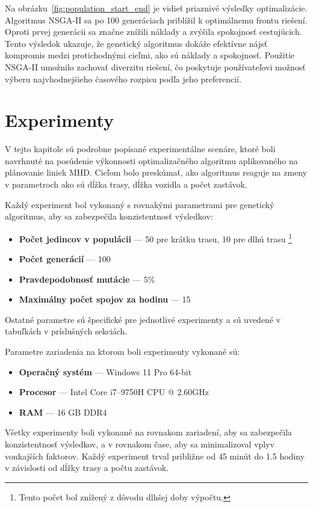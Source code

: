 Na obrázku~\ref{fig:population_start_end} je vidieť priaznivé výsledky optimalizácie.
Algoritmus NSGA-II sa po 100 generáciach priblížil k optimálnemu frontu riešení.
Oproti prvej generácii sa značne znížili náklady a zvýšila spokojnosť cestujúcich.
Tento výsledok ukazuje, že genetický algoritmus dokáže efektívne nájsť kompromis medzi protichodnými cieľmi, ako sú náklady a spokojnosť.
Použitie NSGA-II umožnilo zachovať diverzitu riešení, čo poskytuje používateľovi možnosť výberu najvhodnejšieho časového rozpisu podľa jeho preferencií.

\chapter{Experimenty}\label{experimenty}

V tejto kapitole sú podrobne popísané experimentálne scenáre, ktoré boli navrhnuté na posúdenie výkonnosti optimalizačného algoritmu aplikovaného na plánovanie liniek MHD.
Cieľom bolo preskúmať, ako algoritmus reaguje na zmeny v parametroch ako sú dĺžka trasy, dĺžka vozidla a počet zastávok.

Každý experiment bol vykonaný s rovnakými parametrami pre genetický algoritmus, aby sa zabezpečila konzistentnosť výsledkov:
\begin{itemize}
  \item \textbf{Počet jedincov v populácii} --- 50 pre krátku trasu, 10 pre dlhú trasu \footnote{Tento počet bol znížený z dôvodu dlhšej doby výpočtu.}
  \item \textbf{Počet generácií} --- 100
  \item \textbf{Pravdepodobnosť mutácie} --- 5\%
  \item \textbf{Maximálny počet spojov za hodinu} --- 15
\end{itemize}
Ostatné parametre sú špecifické pre jednotlivé experimenty a sú uvedené v tabuľkách v príslušných sekciách.

Parametre zariadenia na ktorom boli experimenty vykonané sú:
\begin{itemize}
  \item \textbf{Operačný systém} --- Windows 11 Pro 64-bit
  \item \textbf{Procesor} --- Intel Core i7--9750H CPU @ 2.60GHz
  \item \textbf{RAM} --- 16 GB DDR4
\end{itemize}

Všetky experimenty boli vykonané na rovnakom zariadení, aby sa zabezpečila konzistentnosť výsledkov,
a v rovnakom čase, aby sa minimalizoval vplyv vonkajších faktorov.
Každý experiment trval približne od 45 minút do 1.5 hodiny v závislosti od dĺžky trasy a počtu zastávok.

